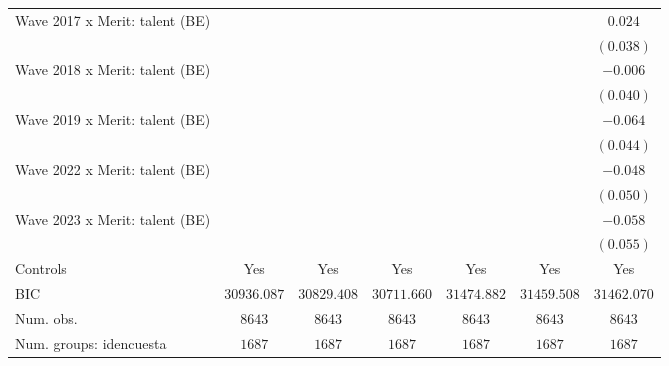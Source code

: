 \documentclass[
  12pt,
]{article}
\begin{document}
\begin{table}
{\begin{center}
{\begin{tabular}{l c c c c c c}
Wave 2017 x Merit: talent (BE)                     &               &               &                &              &               & $0.024$       \\
                                                   &               &               &                &              &               & $(0.038)$     \\
Wave 2018 x Merit: talent (BE)                     &               &               &                &              &               & $-0.006$      \\
                                                   &               &               &                &              &               & $(0.040)$     \\
Wave 2019 x Merit: talent (BE)                     &               &               &                &              &               & $-0.064$      \\
                                                   &               &               &                &              &               & $(0.044)$     \\
Wave 2022 x Merit: talent (BE)                     &               &               &                &              &               & $-0.048$      \\
                                                   &               &               &                &              &               & $(0.050)$     \\
Wave 2023 x Merit: talent (BE)                     &               &               &                &              &               & $-0.058$      \\
                                                   &               &               &                &              &               & $(0.055)$     \\
\hline
Controls                                           & Yes           & Yes           & Yes            & Yes          & Yes           & Yes           \\
BIC                                                & $30936.087$   & $30829.408$   & $30711.660$    & $31474.882$  & $31459.508$   & $31462.070$   \\
Num. obs.                                          & $8643$        & $8643$        & $8643$         & $8643$       & $8643$        & $8643$        \\
Num. groups: idencuesta                            & $1687$        & $1687$        & $1687$         & $1687$       & $1687$        & $1687$        \\

\end{tabular}}
\end{center}}
\end{table}
\end{document}
